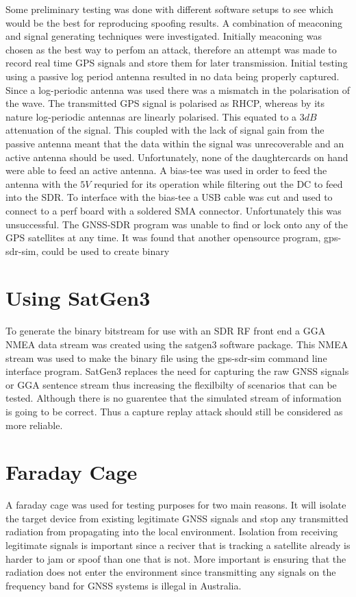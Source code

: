 Some preliminary testing was done with different software setups to see which would be the best for reproducing spoofing results. A combination of meaconing and signal
generating techniques were investigated. Initially meaconing was chosen as the best way to perfom an attack, therefore an attempt was made to record real time GPS signals
and store them for later transmission. Initial testing using a passive log period antenna resulted in no data being properly captured. Since a log-periodic antenna was
used there was a mismatch in the polarisation of the wave. The transmitted GPS signal is polarised as RHCP, whereas by its nature log-periodic antennas are linearly
polarised. This equated to a $3dB$ attenuation of the signal. This coupled with the lack of signal gain from the passive antenna meant that the data within the signal was
unrecoverable and an active antenna should be used. Unfortunately, none of the daughtercards on hand were able to feed an active antenna. A bias-tee was used in order to
feed the antenna with the $5V$ requried for its operation while filtering out the DC to feed into the SDR. To interface with the bias-tee a USB cable was cut and used to
connect to a perf board with a soldered SMA connector. Unfortunately this was unsuccessful. The GNSS-SDR program was unable to find or lock onto any of the GPS satellites
at any time. It was found that another opensource program, gps-sdr-sim, could be used to create binary 

\section{Using SatGen3}

To generate the binary bitstream for use with an SDR RF front end a GGA NMEA data stream was created using the satgen3 software package. This NMEA stream was used to make
the binary file using the gps-sdr-sim command line interface program. SatGen3 replaces the need for capturing the raw GNSS signals or GGA sentence stream thus increasing
the flexilbilty of scenarios that can be tested. Although there is no guarentee that the simulated stream of information is going to be correct. Thus a capture replay
attack should still be considered as more reliable.

\section{Faraday Cage}
A faraday cage was used for testing purposes for two main reasons. It will isolate the target device from existing legitimate GNSS signals and stop any transmitted
radiation from propagating into the local environment. Isolation from receiving legitimate signals is important since a reciver that is tracking a satellite already is
harder to jam or spoof than one that is not. More important is ensuring that the radiation does not enter the environment since transmitting any signals on the frequency
band for GNSS systems is illegal in Australia. 


